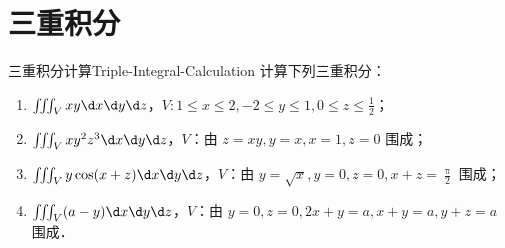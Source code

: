 \section{三重积分}

\begin{problem}{三重积分计算}{Triple-Integral-Calculation}
    计算下列三重积分：
    \begin{enumerate}
        \item $\iiint_V xy \d x \d y \d z$，$V: 1 \le x \le 2, -2 \le y \le 1, 0 \le z \le \frac{1}{2}$；
        \item $\iiint_V xy^2 z^3 \d x \d y \d z$，$V$：由 $z = xy, y = x, x = 1, z = 0$ 围成；
        \item $\iiint_V y \cos(x + z) \d x \d y \d z$，$V$：由 $y = \sqrt{x}, y = 0, z = 0, x + z = \frac{\uppi}{2}$ 围成；
        \item $\iiint_V (a - y) \d x \d y \d z$，$V$：由 $y = 0, z = 0, 2x + y = a, x + y = a, y + z = a$ 围成．
    \end{enumerate}
\end{problem}

